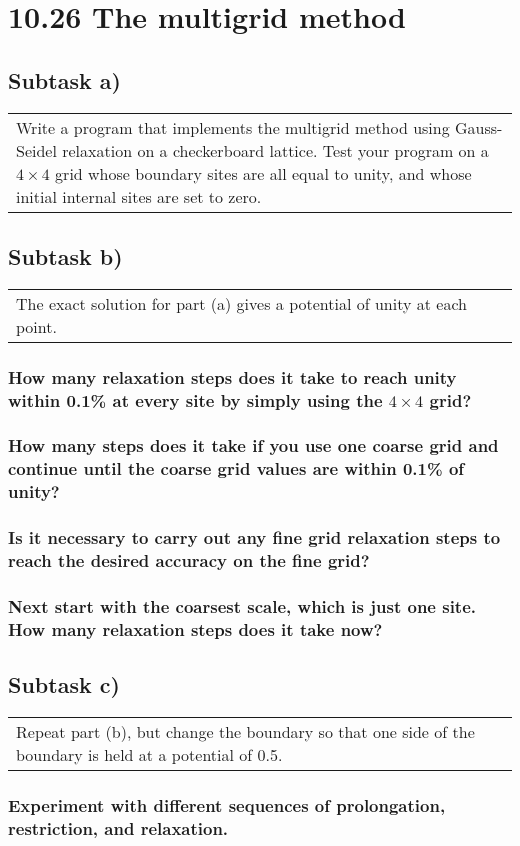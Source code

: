 \documentclass[11pt]{article}
\newcommand{\task}[2]{
  \subsection*{Subtask #1)}
  \begin{tabular}{|p{0.9\textwidth}}
    #2\\
  \end{tabular}
}
\newcommand{\subtask}[1]{
  \subsubsection*{#1}
}
\begin{document}
\section*{10.26 The multigrid method}
\task{a}{
  Write a program that implements the multigrid method using Gauss-Seidel relaxation on a checkerboard lattice. 
  Test your program on a $4×4$ grid whose boundary sites are all equal to unity, and whose initial internal sites are set to zero.
}
\task{b}{
  The exact solution for part (a) gives a potential of unity at each point.
}
\subtask{How many relaxation steps does it take to reach unity within 0.1\% at every site by simply using the $4×4$ grid?}
\subtask{How many steps does it take if you use one coarse grid and continue until the coarse grid values are within 0.1\% of unity?}
\subtask{Is it necessary to carry out any fine grid relaxation steps to reach the desired accuracy on the fine grid?}
\subtask{Next start with the coarsest scale, which is just one site. How many relaxation steps does it take now?}

\task{c}{
  Repeat part (b), but change the boundary so that one side of the boundary is held at a potential of 0.5.
}
\subtask{Experiment with different sequences of prolongation, restriction, and relaxation.}
\end{document}
